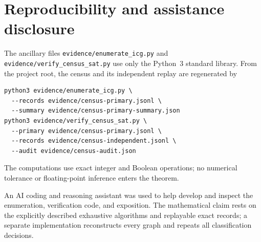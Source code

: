 \documentclass[11pt]{article}
\begin{document}
\section{Reproducibility and assistance disclosure}

The ancillary files \texttt{evidence/enumerate\_icg.py} and
\texttt{evidence/verify\_census\_sat.py} use only the Python~3 standard
library.  From the project root, the census and its independent replay are
regenerated by
\begin{verbatim}
python3 evidence/enumerate_icg.py \
  --records evidence/census-primary.jsonl \
  --summary evidence/census-primary-summary.json
python3 evidence/verify_census_sat.py \
  --primary evidence/census-primary.jsonl \
  --records evidence/census-independent.jsonl \
  --audit evidence/census-audit.json
\end{verbatim}
The computations use exact integer and Boolean operations; no numerical
tolerance or floating-point inference enters the theorem.

An AI coding and reasoning assistant was used to help develop and inspect
the enumeration, verification code, and exposition.  The mathematical claim
rests on the explicitly described exhaustive algorithms and replayable exact
records; a separate implementation reconstructs every graph and repeats all
classification decisions.



\end{document}
